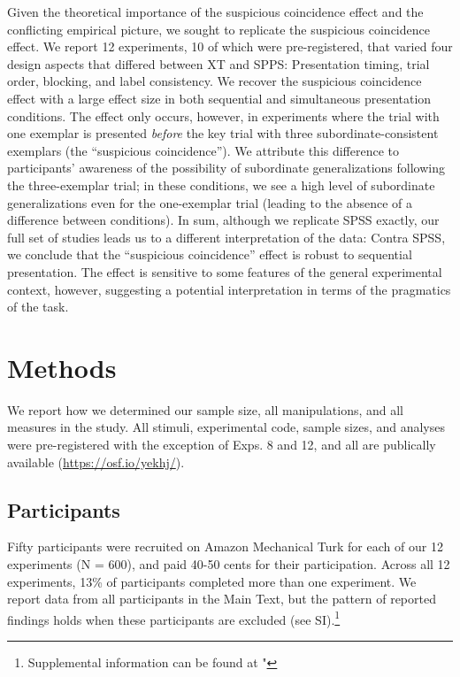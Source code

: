 \documentclass[english,floatsintext,man]{apa6}
\theoremstyle{definition}
\theoremstyle{definition}
\theoremstyle{remark}
\begin{document}
Given the theoretical importance of the suspicious coincidence effect
and the conflicting empirical picture, we sought to replicate the
suspicious coincidence effect. We report 12 experiments, 10 of which
were pre-registered, that varied four design aspects that differed
between XT and SPPS: Presentation timing, trial order, blocking, and
label consistency. We recover the suspicious coincidence effect with a
large effect size in both sequential and simultaneous presentation
conditions. The effect only occurs, however, in experiments where the
trial with one exemplar is presented \emph{before} the key trial with
three subordinate-consistent exemplars (the \enquote{suspicious
coincidence}). We attribute this difference to participants' awareness
of the possibility of subordinate generalizations following the
three-exemplar trial; in these conditions, we see a high level of
subordinate generalizations even for the one-exemplar trial (leading to
the absence of a difference between conditions). In sum, although we
replicate SPSS exactly, our full set of studies leads us to a different
interpretation of the data: Contra SPSS, we conclude that the
\enquote{suspicious coincidence} effect is robust to sequential
presentation. The effect is sensitive to some features of the general
experimental context, however, suggesting a potential interpretation in
terms of the pragmatics of the task.

\section{Methods}\label{methods}

We report how we determined our sample size, all manipulations, and all
measures in the study. All stimuli, experimental code, sample sizes, and
analyses were pre-registered with the exception of Exps. 8 and 12, and
all are publically available (\url{https://osf.io/yekhj/}).

\subsection{Participants}\label{participants}

Fifty participants were recruited on Amazon Mechanical Turk for each of
our 12 experiments (N = 600), and paid 40-50 cents for their
participation. Across all 12 experiments, 13\% of participants completed
more than one experiment. We report data from all participants in the
Main Text, but the pattern of reported findings holds when these
participants are excluded (see
SI).\footnote{Supplemental information can be found at "}
\end{document}
